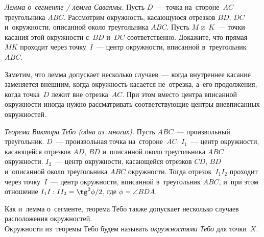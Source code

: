 \begin{problems}
\item\emph{Лемма о~сегменте / лемма Саваямы.}
Пусть $D$~--- точка на~стороне~$AC$ треугольника $ABC$.
Рассмотрим окружность, касающуюся отрезков $BD$, $DC$ и~окружности, описанной
около треугольника $ABC$.
Пусть $M$ и~$K$~--- точки касания этой окружности с~$BD$ и~$DC$ соответственно.
Докажите, что прямая~$MK$ проходит через точку~$I$~--- центр окружности,
вписанной в~треугольник $ABC$.

\end{problems}

Заметим, что лемма допускает несколько случаев~--- когда внутреннее касание
заменяется внешним, когда окружность касается не~отрезка, а~его продолжения,
когда точка~$D$ лежит вне отрезка~$AC$.
При этом вместо центра вписанной окружности иногда нужно рассматривать
соответствующие центры вневписанных окружностей.

\begin{problems}

\item \emph{Теорема Виктора Тебо (одна из~многих).}
Пусть $ABC$~--- произвольный треугольник.
$D$~--- произвольная точка на~стороне~$AC$.
$I_{1}$~--- центр окружности, касающейся отрезков $AD$, $BD$ и~описанной около
треугольника $ABC$ окружности.
$I_{2}$~--- центр окружности, касающейся отрезков $CD$, $BD$ и~описанной около
треугольника $ABC$ окружности.
Тогда отрезок~$I_{1}I_{2}$ проходит через точку~$I$~--- центр окружности,
вписанной в~треугольник $ABC$, и~при этом отношение
$I_{1}I : II_{2} = \tg^2{\phi/2}$, где $\phi = \angle BDA$.

\end{problems}

Как и~лемма о~сегменте, теорема Тебо также допускает несколько случаев
расположения окружностей.
\\
Окружности из~теоремы Тебо будем называть
\emph{окружностями Тебо} для точки~$X$.


